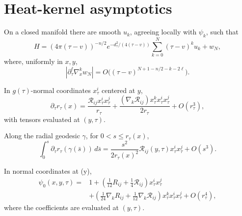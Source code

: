 \section{Heat-kernel asymptotics}

\begin{theorem}
\label{thm:chow-iii-evolving-heat-kernel-expansion}
On a closed manifold there are smooth \(u_k\), agreeing locally with
\(\psi_k\), such that
\[
 H=(4\pi(\tau-v))^{-n/2}e^{-d_\tau^2/(4(\tau-v))}
 \sum_{k=0}^N(\tau-v)^ku_k+w_N,
\]
where, uniformly in \(x,y\),
\[
 |\partial_\tau^\ell\nabla_x^kw_N|
 =O\bigl((\tau-v)^{N+1-n/2-k-2\ell}\bigr).
\]
\end{theorem}

\begin{lemma}
\label{lem:chow-iii-changing-distance-expansion}
In \(g(\tau)\)-normal coordinates \(x_\tau^i\) centered at \(y\),
\[
 \partial_\tau r_\tau(x)=\frac{\mathcal R_{ij}x_\tau^ix_\tau^j}{r_\tau}
 +\frac{(\nabla_k\mathcal R_{ij})x_\tau^kx_\tau^ix_\tau^j}{2r_\tau}
 +O(r_\tau^3),
\]
with tensors evaluated at \((y,\tau)\).
\end{lemma}

\begin{remark}
\label{rem:chow-iii-integrated-distance-expansion}
Along the radial geodesic \(\gamma\), for \(0<s\le r_\tau(x)\),
\[
 \int_0^s\partial_\tau r_\tau(\gamma(\bar s))\,d\bar s
 =\frac{s^2}{2r_\tau(x)^2}\mathcal R_{ij}(y,\tau)x_\tau^ix_\tau^j
 +O(s^3).
\]
\end{remark}

\begin{lemma}
\label{lem:chow-iii-psi-zero-expansion}
In normal coordinates at (y),
\[
 \begin{aligned}
 \psi_0(x,y,\tau)={}&1+
 \left(\frac1{12}R_{ij}+\frac14\mathcal R_{ij}\right)x_\tau^ix_\tau^j\\
 &+\left(\frac1{24}\nabla_kR_{ij}
          +\frac1{12}\nabla_k\mathcal R_{ij}\right)
 x_\tau^kx_\tau^ix_\tau^j+O(r_\tau^4),
 \end{aligned}
\]
where the coefficients are evaluated at \((y,\tau)\).
\end{lemma}

